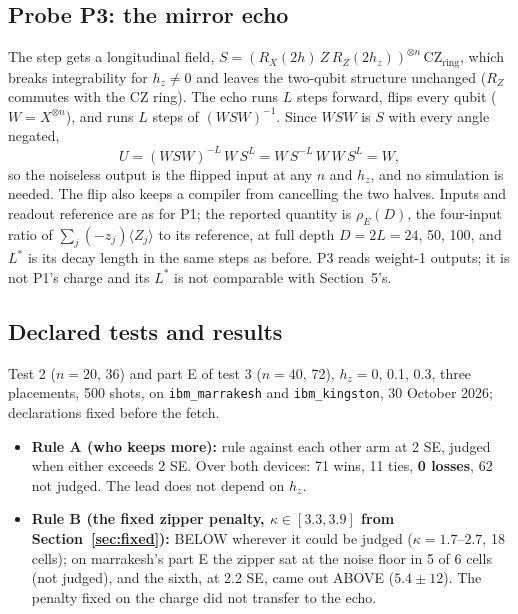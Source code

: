 \documentclass[11pt]{article}
\begin{document}
\subsection{Probe P3: the mirror echo}
The step gets a longitudinal field, $S=(R_X(2h)\,Z\,R_Z(2h_z))^{\otimes n}\,\mathrm{CZ}_{\mathrm{ring}}$, which breaks
integrability for $h_z\neq0$ and leaves the two-qubit structure unchanged ($R_Z$ commutes with the CZ ring). The echo
runs $L$ steps forward, flips every qubit ($W=X^{\otimes n}$), and runs $L$ steps of $(WSW)^{-1}$. Since
$WSW$ is $S$ with every angle negated,
\[
U=(WSW)^{-L}\,W\,S^{L}=W\,S^{-L}\,W\,W\,S^{L}=W ,
\]
so the noiseless output is the flipped input at any $n$ and $h_z$, and no simulation is needed. The flip also keeps a
compiler from cancelling the two halves. Inputs and readout reference are as for P1; the reported quantity is
$\rho_E(D)$, the four-input ratio of $\sum_j(-z_j)\langle Z_j\rangle$ to its reference, at full depth $D=2L=24$, 50,
100, and $L^*$ is its decay length in the same steps as before. P3 reads weight-1 outputs; it is not P1's charge and its
$L^*$ is not comparable with Section~5's.

\subsection{Declared tests and results}
Test 2 ($n=20$, 36) and part E of test 3 ($n=40$, 72), $h_z=0$, 0.1, 0.3, three placements, 500 shots, on
\texttt{ibm\_marrakesh} and \texttt{ibm\_kingston}, 30 October 2026; declarations fixed before the fetch.
\begin{itemize}
\item \textbf{Rule A (who keeps more):} rule against each other arm at 2 SE, judged when either exceeds 2 SE. Over both
  devices: 71 wins, 11 ties, \textbf{0 losses}, 62 not judged. The lead does not depend on $h_z$.
\item \textbf{Rule B (the fixed zipper penalty, $\kappa\in[3.3,3.9]$ from Section~\ref{sec:fixed}):} BELOW wherever it
  could be judged ($\kappa=1.7$--$2.7$, 18 cells); on marrakesh's part E the zipper sat at the noise floor in 5 of 6
  cells (not judged), and the sixth, at 2.2 SE, came out ABOVE ($5.4\pm12$).
  The penalty fixed on the charge did not transfer to the echo.
\end{itemize}
\end{document}
